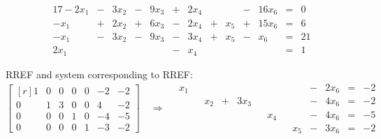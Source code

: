 \documentclass[12pt]{article}
\begin{document}
\begin{alignat*}{17}
- 2 x_{1} &{}-{}& 3 x_{2} &{}-{}& 9 x_{3} &{}+{}& 2 x_{4} &{}{}& &{}-{}& 16 x_{6} &{}={}&0\\ 
- x_{1} &{}+{}& 2 x_{2} &{}+{}& 6 x_{3} &{}-{}& 2 x_{4} &{}+{}&  x_{5} &{}+{}& 15 x_{6} &{}={}&6\\ 
- x_{1} &{}-{}& 3 x_{2} &{}-{}& 9 x_{3} &{}-{}& 3 x_{4} &{}+{}&  x_{5} &{}-{}& x_{6} &{}={}&21\\ 
2 x_{1}&{}{}&&{}{}& &{}-{}& x_{4}&{}{}&&{}{}& &{}={}&1 
\end{alignat*}

RREF and system corresponding to RREF:
\[
\left[\begin{matrix*}[r]1 & 0 & 0 & 0 & 0 & -2 & -2\\0 & 1 & 3 & 0 & 0 & 4 & -2\\0 & 0 & 0 & 1 & 0 & -4 & -5\\0 & 0 & 0 & 0 & 1 & -3 & -2\end{matrix*}\right]
\quad\Longrightarrow\quad
\begin{alignedat}{12}
x_1 &&     &&           &&     &&     &{}-{}& 2x_6 &{}={}& -2\\
    && x_2 &{}+{}& 3x_3 &&     &&     &{}-{}& 4x_6 &{}={}& -2\\
    &&     &&           && x_4 &&     &{}-{}& 4x_6 &{}={}& -5\\
    &&     &&           &&     && x_5 &{}-{}& 3x_6 &{}={}& -2    
\end{alignedat}
\]
\end{document}
